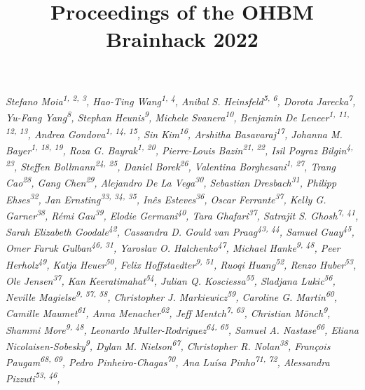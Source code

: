 \documentclass[12pt,a4paper]{proc}
\author{}\date{} %
\title{Proceedings of the OHBM Brainhack 2022}
\newcommand{\authors}[1]{\emph{\footnotesize #1} \\}
\begin{document}
\hfill\authors{Stefano Moia\textsuperscript{1, 2, 3}, %
Hao-Ting Wang\textsuperscript{1, 4}, %
Anibal S. Heinsfeld\textsuperscript{5, 6}, %
Dorota Jarecka\textsuperscript{7}, %
Yu-Fang Yang\textsuperscript{8}, %
Stephan Heunis\textsuperscript{9}, %
Michele Svanera\textsuperscript{10}, %
Benjamin De Leneer\textsuperscript{1, 11, 12, 13}, %
Andrea Gondova\textsuperscript{1, 14, 15}, %
Sin Kim\textsuperscript{16}, %
Arshitha Basavaraj\textsuperscript{17}, %
Johanna M. Bayer\textsuperscript{1, 18, 19}, %
Roza G. Bayrak\textsuperscript{1, 20}, %
Pierre-Louis Bazin\textsuperscript{21, 22}, %
Isil Poyraz Bilgin\textsuperscript{4, 23}, %
Steffen Bollmann\textsuperscript{24, 25}, %
Daniel Borek\textsuperscript{26}, %
Valentina Borghesani\textsuperscript{1, 27}, %
Trang Cao\textsuperscript{28}, %
Gang Chen\textsuperscript{29}, %
Alejandro De La Vega\textsuperscript{30}, %
Sebastian Dresbach\textsuperscript{31}, %
Philipp Ehses\textsuperscript{32}, %
Jan Ernsting\textsuperscript{33, 34, 35}, %
Inês Esteves\textsuperscript{36}, %
Oscar Ferrante\textsuperscript{37}, %
Kelly G. Garner\textsuperscript{38}, %
Rémi Gau\textsuperscript{39}, %
Elodie Germani\textsuperscript{40}, %
Tara Ghafari\textsuperscript{37}, %
Satrajit S. Ghosh\textsuperscript{7, 41}, %
Sarah Elizabeth Goodale\textsuperscript{42}, %
Cassandra D. Gould van Praag\textsuperscript{43, 44}, %
Samuel Guay\textsuperscript{45}, %
Omer Faruk Gulban\textsuperscript{46, 31}, %
Yaroslav O. Halchenko\textsuperscript{47}, %
Michael Hanke\textsuperscript{9, 48}, %
Peer Herholz\textsuperscript{49}, %
Katja Heuer\textsuperscript{50}, %
Felix Hoffstaedter\textsuperscript{9, 51}, %
Ruoqi Huang\textsuperscript{52}, %
Renzo Huber\textsuperscript{53}, %
Ole Jensen\textsuperscript{37}, %
Kan Keeratimahat\textsuperscript{54}, %
Julian Q. Kosciessa\textsuperscript{55}, %
Sladjana Lukic\textsuperscript{56}, %
Neville Magielse\textsuperscript{9, 57, 58}, %
Christopher J. Markiewicz\textsuperscript{59}, %
Caroline G. Martin\textsuperscript{60}, %
Camille Maumet\textsuperscript{61}, %
Anna Menacher\textsuperscript{62}, %
Jeff Mentch\textsuperscript{7, 63}, %
Christian Mönch\textsuperscript{9}, %
Shammi More\textsuperscript{9, 48}, %
Leonardo Muller-Rodriguez\textsuperscript{64, 65}, %
Samuel A. Nastase\textsuperscript{66}, %
Eliana Nicolaisen-Sobesky\textsuperscript{9}, %
Dylan M. Nielson\textsuperscript{67}, %
Christopher R. Nolan\textsuperscript{38}, %
François Paugam\textsuperscript{68, 69}, %
Pedro Pinheiro-Chagas\textsuperscript{70}, %
Ana Luísa Pinho\textsuperscript{71, 72}, %
Alessandra Pizzuti\textsuperscript{53, 46}, %
}
\end{document}
